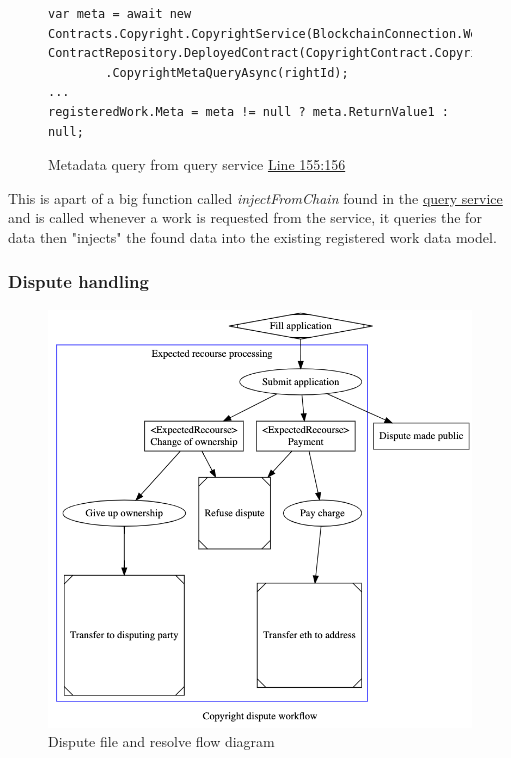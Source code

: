 \begin{figure}[H]
\caption{Metadata query from query service \href{https://github.com/MrHarrisonBarker/CRPL/blob/main/CRPL.Web/Services/QueryService.cs}{Line 155:156}}
\centering
\begin{lstlisting}[language=CSharp]
var meta = await new Contracts.Copyright.CopyrightService(BlockchainConnection.Web3(), ContractRepository.DeployedContract(CopyrightContract.Copyright).Address)
		.CopyrightMetaQueryAsync(rightId);
...
registeredWork.Meta = meta != null ? meta.ReturnValue1 : null;
\end{lstlisting}
\end{figure}

This is apart of a big function called \textit{injectFromChain} found in the \href{https://github.com/MrHarrisonBarker/CRPL/blob/main/CRPL.Web/Services/QueryService.cs}{query service} and is called whenever a work is requested from the service, it queries the  for data then "injects" the found data into the existing registered work data model.

\subsubsection{Dispute handling}

\begin{figure}[H]
\caption{Dispute file and resolve flow diagram}
\centering
\includegraphics[width=\textwidth,height=\textheight,keepaspectratio]{images/operational/dispute-workflow}
\end{figure}

